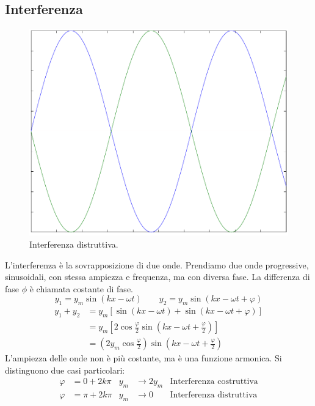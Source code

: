\subsection{Interferenza}
\begin{figure}[htbp]
   \centering
   \includegraphics[scale=0.5]{immagini/fisica1/interferenza_distruttiva}
   \caption{Interferenza distruttiva.}
\end{figure}
L'interferenza è la sovrapposizione di due onde. Prendiamo due onde progressive, sinusoidali, con stessa ampiezza e frequenza, ma con diversa fase. La differenza di fase $\phi$ è chiamata costante di fase.
\[y_1=y_m\sin(kx-\omega t)\qquad y_2=y_m\sin(kx-\omega t+\varphi)\]
\begin{align*}
   y_1+y_2 & =y_m\left[\sin\left(kx-\omega t\right)+\sin\left(kx-\omega t+\varphi\right)\right]    \\
           & =y_m\left[2\cos\frac{\varphi}{2}\sin\left(kx-\omega t+\frac{\varphi}{2}\right)\right] \\
           & =\left(2y_m\cos\frac{\varphi}{2}\right)\sin\left(kx-\omega t+\frac{\varphi}{2}\right)
\end{align*}
L'ampiezza delle onde non è più costante, ma è una funzione armonica. Si distinguono due casi particolari:
\begin{align*}
   \varphi & =0+2k\pi   & y_m & \rightarrow 2y_m & \text{Interferenza costruttiva} \\
   \varphi & =\pi+2k\pi & y_m & \rightarrow 0    & \text{Interferenza distruttiva}
\end{align*}
